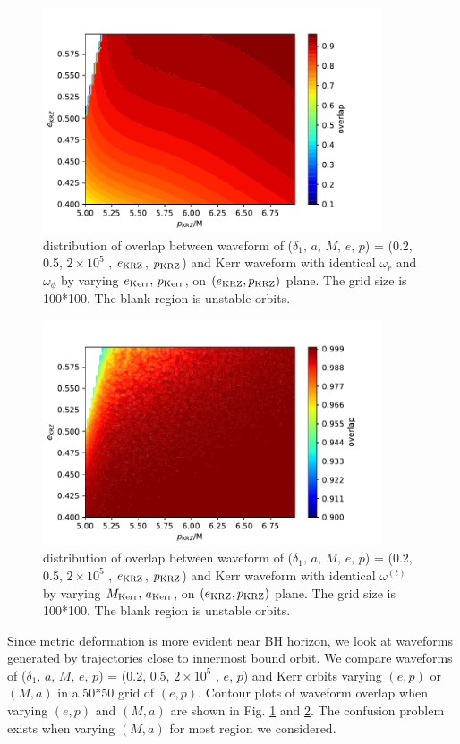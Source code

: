 \documentclass{article}
\begin{document}
	\begin{figure}[!h]
	\centering
	\includegraphics[width=10cm]{ep_best_dist.pdf}
	
	\caption{distribution of overlap between waveform of ($\delta_1,\, a,\, M,\, e,\, p$) = (0.2, 0.5, $2 \times 10^5 $ , $e_{\rm{KRZ}}$, $p_{\rm{KRZ}}$) and Kerr waveform with identical $\omega_r$ and $\omega_\phi$ by varying $e_{\rm{Kerr}},\, p_{\rm{Kerr}}$, on $(e_{\rm KRZ},p_{\rm KRZ})$ plane. The grid size is 100*100. The blank region is unstable orbits.}
	\label{epdist}
\end{figure}	

	\begin{figure}[!ht]
	\centering
	\includegraphics[width=10cm]{FF_am.pdf}
	
	\caption{distribution of overlap between waveform of ($\delta_1,\, a,\, M,\, e,\, p$) = (0.2, 0.5, $2 \times 10^5 $ , $e_{\rm{KRZ}}$, $p_{\rm{KRZ}}$) and Kerr waveform with identical $\omega^{(t)}$ by varying $M_{\rm{Kerr}},\, a_{\rm{Kerr}}$, on $(e_{\rm KRZ},p_{\rm KRZ})$ plane. The grid size is 100*100. The blank region is unstable orbits.}
	\label{amdist}
\end{figure}	

Since metric deformation is more evident near BH horizon, we look at waveforms generated by trajectories close to innermost bound orbit. We compare waveforms of ($\delta_1,\, a,\, M,\, e,\, p$) = (0.2, 0.5, $2 \times 10^5 $ , $e$, $p$) and Kerr orbits varying $(e,p)$ or $(M,a)$ in a 50*50 grid of $(e,p)$. Contour plots of waveform overlap when varying $(e,p)$ and $(M,a)$ are shown in Fig. \ref{epdist} and \ref{amdist}. The confusion problem exists when varying $(M,a)$ for most region we considered. 
\end{document}
